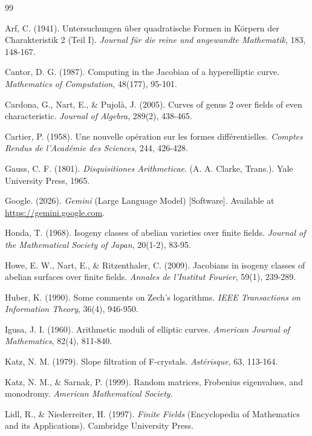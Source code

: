\documentclass[11pt,letterpaper]{article}
\begin{document}
\begin{thebibliography}{99}

Arf, C. (1941). Untersuchungen über quadratische Formen in Körpern der Charakteristik 2 (Teil I). \textit{Journal für die reine und angewandte Mathematik}, 183, 148-167.

Cantor, D. G. (1987). Computing in the Jacobian of a hyperelliptic curve. \textit{Mathematics of Computation}, 48(177), 95-101.

Cardona, G., Nart, E., \& Pujolà, J. (2005). Curves of genus 2 over fields of even characteristic. \textit{Journal of Algebra}, 289(2), 438-465.

Cartier, P. (1958). Une nouvelle op\'{e}ration sur les formes diff\'{e}rentielles. \textit{Comptes Rendus de l'Acad\'{e}mie des Sciences}, 244, 426-428.

Gauss, C. F. (1801). \textit{Disquisitiones Arithmeticae}. (A. A. Clarke, Trans.). Yale University Press, 1965.

Google. (2026). \textit{Gemini} (Large Language Model) [Software]. Available at \url{https://gemini.google.com}.

Honda, T. (1968). Isogeny classes of abelian varieties over finite fields. \textit{Journal of the Mathematical Society of Japan}, 20(1-2), 83-95.

Howe, E. W., Nart, E., \& Ritzenthaler, C. (2009). Jacobians in isogeny classes of abelian surfaces over finite fields. \textit{Annales de l'Institut Fourier}, 59(1), 239-289.

Huber, K. (1990). Some comments on Zech's logarithms. \textit{IEEE Transactions on Information Theory}, 36(4), 946-950.

Igusa, J. I. (1960). Arithmetic moduli of elliptic curves. \textit{American Journal of Mathematics}, 82(4), 811-840.

Katz, N. M. (1979). Slope filtration of F-crystals. \textit{Astérisque}, 63, 113-164.

Katz, N. M., \& Sarnak, P. (1999). Random matrices, Frobenius eigenvalues, and monodromy. \textit{American Mathematical Society}.

Lidl, R., \& Niederreiter, H. (1997). \textit{Finite Fields} (Encyclopedia of Mathematics and its Applications). Cambridge University Press.


\end{thebibliography}
\end{document}
